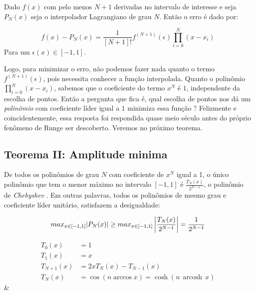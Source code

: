 Dado $f(x)$  com pelo menos $N+1$ derivadas no intervalo de interesse e seja $P_N(x)$ seja o interpolador Lagrangiano de grau $N$. Então o erro é dado por:
 
 \begin{equation}
 f(x) - P_N(x) = \frac{1}{[N+1]!}f^{(N+1)}(\epsilon)\prod^{N}_{i = 0} (x - x_i)
 \end{equation}
 Para um $\epsilon(x) \in [-1,1]$.
 
 Logo, para minimizar o erro, não podemos fazer nada quanto o termo $f^(N+1)(\epsilon)$, pois necessita conhecer a função interpolada. Quanto o polinômio $\prod^{N}_{i = 0} (x - x_i)$, sabemos que o coeficiente do termo $x^N$ é $1$, independente da escolha de pontos. Então a pergunta que fica é, qual escolha de pontos nos dá um \emph{polinômio} com coeficiente líder igual a $1$ minimiza essa função ? Felizmente e coincidentemente, essa resposta foi respondida quase meio século antes do próprio fenômeno de Runge ser descoberto. Veremos no próximo teorema.

 
\subsection{Teorema II: Amplitude minima}
 De todos os polinômios de grau $N$ com coeficiente de $x^N$ igual a 1, o único polinômio que tem o menor máximo no intervalo $[-1,1]$ é $\frac{T_N(x)}{2^{N-1}}$, o polinômio de \emph{Chebyshev} . Em outras palavras, todos os polinômios de mesmo grau e coeficiente líder unitário, satisfazem a desigualdade: 

\begin{equation}
	max_{x \in [-1,1]}|P_N(x)| \geq  max_{x \in [-1,1]} \left |\frac{T_N(x)}{2^{N-1}}  \right |  = \frac{1}{2^{N-1}}\\
\end{equation}


\begin{align}
    T_0(x) &= 1\\
    T_1(x) &= x\\
    T_{N+1}(x) &= 2xT_N(x) - T_{N-1}(x)\\
    T_{N}(x)&=\cos(n \arccos x)=\cosh(n\,\operatorname{arcosh}\,x)
\end{align} \& 

